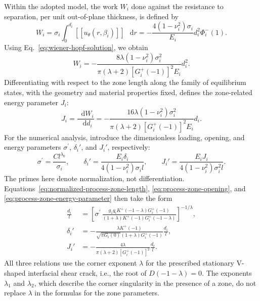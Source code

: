 \documentclass[pdflatex,onecolumn,sn-mathphys-ay]{sn-jnl}
\newcommand{\dd}{\mathop{}\!\mathrm{d}}
\newcommand{\sigmap}{\sigma^{\prime}}
\newcommand{\jump}[1]{\left[\!\left[#1\right]\!\right]}
\begin{document}
Within the adopted model, the work $W_i$ done against the resistance
to separation, per unit out-of-plane thickness, is defined
by~\citep{Cherepanov1986}
\begin{equation*}
  W_i=\sigma_i\int_0^{d_i}
      \jump{u_\theta(r,\beta_i)}\,\dd r
  =-\frac{4(1-\nu_i^2)\sigma_i}{E_i}d_i^2\Phi_i^-(1).
\end{equation*}
Using Eq.~\eqref{eq:wiener-hopf-solution}, we obtain
\begin{equation*}
  W_i=-\frac{8\lambda(1-\nu_i^2)\sigma_i^2}
  {\pi(\lambda+2)[G_i^+(-1)]^2E_i}d_i^2.
\end{equation*}
Differentiating with respect to the zone length along the family of
equilibrium states, with the geometry and material properties fixed,
defines the zone-related energy parameter $J_i$:
\begin{equation}
\label{eq:process-zone-energy-parameter}
  J_i=\frac{\dd W_i}{\dd d_i}
  =-\frac{16\lambda(1-\nu_i^2)\sigma_i^2}
  {\pi(\lambda+2)[G_i^+(-1)]^2E_i}d_i.
\end{equation}
For the numerical analysis, introduce the dimensionless loading,
opening, and energy parameters $\sigmap$, $\delta_i'$, and $J_i'$,
respectively:
\begin{equation*}
  \sigmap=\frac{Cl^{\lambda_0}}{\sigma_i},
  \qquad
  \delta_i'=\frac{E_i\delta_i}
  {4(1-\nu_i^2)\sigma_i l},
  \qquad
  J_i'=\frac{E_iJ_i}
  {4(1-\nu_i^2)\sigma_i^2l}.
\end{equation*}
The primes here denote normalization, not differentiation.
Equations~\eqref{eq:normalized-process-zone-length},
\eqref{eq:process-zone-opening}, and
\eqref{eq:process-zone-energy-parameter} then take the form
\begin{equation*}
\begin{aligned}
  \frac{d_i}{l}
    &=\left[
      \sigmap\,
      \frac{g_1q_iK^+(-1-\lambda)G_i^+(-1)}
      {(1+\lambda)K^+(-1)G_i^+(-1-\lambda)}
    \right]^{-1/\lambda},\\[2pt]
  \delta_i'
    &=-\frac{\lambda K^+(-1)}
      {\sqrt{\pi G_i(0)}(1+\lambda)G_i^+(-1)}
      \frac{d_i}{l},\\[2pt]
  J_i'
    &=-\frac{4\lambda}
      {\pi(\lambda+2)[G_i^+(-1)]^2}
      \frac{d_i}{l}.
\end{aligned}
\end{equation*}
All three relations use the corner exponent $\lambda$ for the prescribed
stationary V-shaped interfacial shear crack, i.e., the root of
$D(-1-\lambda)=0$.
The exponents $\lambda_1$ and $\lambda_2$, which describe the corner
singularity in the presence of a zone, do not replace $\lambda$
in the formulas for the zone parameters.
\end{document}
